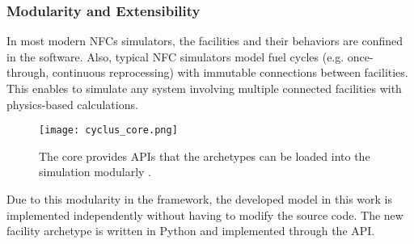 \subsubsection{Modularity and Extensibility}

In most modern \glspl{NFC} simulators, the facilities and their
behaviors are confined in the software.
Also, typical \gls{NFC} simulators model
fuel cycles (e.g. once-through, continuous reprocessing)
with immutable connections between facilities. 
This enables \Cyclus to simulate any system
involving multiple connected facilities with physics-based
calculations.

\begin{figure}[htbp!]
    \begin{center}
        \texttt{[image: cyclus\_core.png]}
    \end{center}
    \caption{The \Cyclus core provides APIs that the archetypes
            can be loaded into the simulation modularly
            \cite{huff_fundamental_2016}.}
    \label{fig:core}
\end{figure}

Due to this modularity in the \Cyclus framework, the developed
model in this work is implemented independently without
having to modify the \Cyclus source code. The new facility archetype
is written in Python and implemented through the \Cyclus API.
